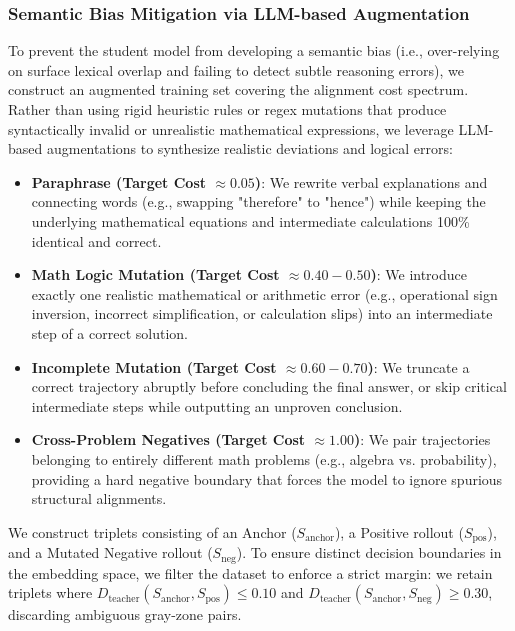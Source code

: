 \documentclass[conference]{IEEEtran}
\begin{document}
\subsubsection{Semantic Bias Mitigation via LLM-based Augmentation}
To prevent the student model from developing a semantic bias (i.e., over-relying on surface lexical overlap and failing to detect subtle reasoning errors), we construct an augmented training set covering the alignment cost spectrum. Rather than using rigid heuristic rules or regex mutations that produce syntactically invalid or unrealistic mathematical expressions, we leverage LLM-based augmentations to synthesize realistic deviations and logical errors:
\begin{itemize}
    \item \textbf{Paraphrase (Target Cost $\approx 0.05$)}: We rewrite verbal explanations and connecting words (e.g., swapping "therefore" to "hence") while keeping the underlying mathematical equations and intermediate calculations 100\% identical and correct.
    \item \textbf{Math Logic Mutation (Target Cost $\approx 0.40 - 0.50$)}: We introduce exactly one realistic mathematical or arithmetic error (e.g., operational sign inversion, incorrect simplification, or calculation slips) into an intermediate step of a correct solution.
    \item \textbf{Incomplete Mutation (Target Cost $\approx 0.60 - 0.70$)}: We truncate a correct trajectory abruptly before concluding the final answer, or skip critical intermediate steps while outputting an unproven conclusion.
    \item \textbf{Cross-Problem Negatives (Target Cost $\approx 1.00$)}: We pair trajectories belonging to entirely different math problems (e.g., algebra vs. probability), providing a hard negative boundary that forces the model to ignore spurious structural alignments.
\end{itemize}
We construct triplets consisting of an Anchor ($S_{\text{anchor}}$), a Positive rollout ($S_{\text{pos}}$), and a Mutated Negative rollout ($S_{\text{neg}}$). To ensure distinct decision boundaries in the embedding space, we filter the dataset to enforce a strict margin: we retain triplets where $D_{\text{teacher}}(S_{\text{anchor}}, S_{\text{pos}}) \le 0.10$ and $D_{\text{teacher}}(S_{\text{anchor}}, S_{\text{neg}}) \ge 0.30$, discarding ambiguous gray-zone pairs.
\end{document}
